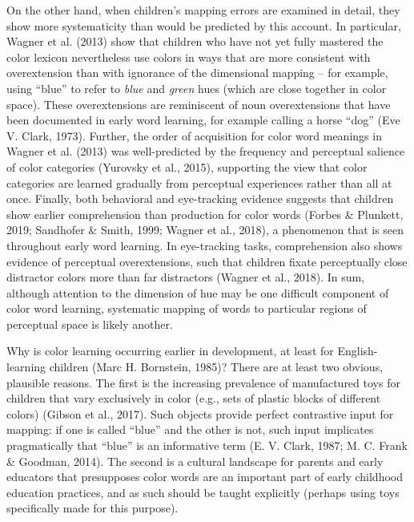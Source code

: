 \documentclass[
  english,
  ,apa7,floatsintext]{apa6}
\begin{document}
On the other hand, when children's mapping errors are examined in detail, they show more systematicity than would be predicted by this account. In particular, Wagner et al. (2013) show that children who have not yet fully mastered the color lexicon nevertheless use colors in ways that are more consistent with overextension than with ignorance of the dimensional mapping -- for example, using ``blue'' to refer to \emph{blue} and \emph{green} hues (which are close together in color space). These overextensions are reminiscent of noun overextensions that have been documented in early word learning, for example calling a horse ``dog'' (Eve V. Clark, 1973). Further, the order of acquisition for color word meanings in Wagner et al. (2013) was well-predicted by the frequency and perceptual salience of color categories (Yurovsky et al., 2015), supporting the view that color categories are learned gradually from perceptual experiences rather than all at once. Finally, both behavioral and eye-tracking evidence suggests that children show earlier comprehension than production for color words (Forbes \& Plunkett, 2019; Sandhofer \& Smith, 1999; Wagner et al., 2018), a phenomenon that is seen throughout early word learning. In eye-tracking tasks, comprehension also shows evidence of perceptual overextensions, such that children fixate perceptually close distractor colors more than far distractors (Wagner et al., 2018). In sum, although attention to the dimension of hue may be one difficult component of color word learning, systematic mapping of words to particular regions of perceptual space is likely another.

Why is color learning occurring earlier in development, at least for English-learning children (Marc H. Bornstein, 1985)? There are at least two obvious, plausible reasons. The first is the increasing prevalence of manufactured toys for children that vary exclusively in color (e.g., sets of plastic blocks of different colors) (Gibson et al., 2017). Such objects provide perfect contrastive input for mapping: if one is called ``blue'' and the other is not, such input implicates pragmatically that ``blue'' is an informative term (E. V. Clark, 1987; M. C. Frank \& Goodman, 2014). The second is a cultural landscape for parents and early educators that presupposes color words are an important part of early childhood education practices, and as such should be taught explicitly (perhaps using toys specifically made for this purpose).
\end{document}
